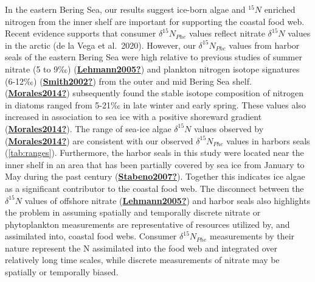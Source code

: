 \documentclass [11pt, proquest] {uwthesis}[2015/03/03]
\begin{document}
In the eastern Bering Sea, our results suggest ice-born algae and \(^{15}N\) enriched nitrogen from the inner shelf are important for supporting the coastal food web. Recent evidence supports that consumer \(\delta^{15}N_{Phe}\) values reflect nitrate \(\delta^{15}N\) values in the arctic (de la Vega et al.~2020). However, our \(\delta^{15}N_{Phe}\) values from harbor seals of the eastern Bering Sea were high relative to previous studies of summer nitrate (5 to 9‰) (\protect\hyperlink{ref-Lehmann2005}{\textbf{Lehmann2005?}}) and plankton nitrogen isotope signatures (6-12‰) (\protect\hyperlink{ref-Smith2002}{\textbf{Smith2002?}}) from the outer and mid Bering Sea shelf. (\protect\hyperlink{ref-Morales2014}{\textbf{Morales2014?}}) subsequently found the stable isotope composition of nitrogen in diatoms ranged from 5-21‰ in late winter and early spring. These values also increased in association to sea ice with a positive shoreward gradient (\protect\hyperlink{ref-Morales2014}{\textbf{Morales2014?}}). The range of sea-ice algae \(\delta^{15}N\) values observed by (\protect\hyperlink{ref-Morales2014}{\textbf{Morales2014?}}) are consistent with our observed \(\delta^{15}N_{Phe}\) values in harbors seals (\ref{tab:ranges}). Furthermore, the harbor seals in this study were located near the inner shelf in an area that has been partially covered by sea ice from January to May during the past century (\protect\hyperlink{ref-Stabeno2007}{\textbf{Stabeno2007?}}). Together this indicates ice algae as a significant contributor to the coastal food web. The disconnect between the \(\delta^{15}N\) values of offshore nitrate (\protect\hyperlink{ref-Lehmann2005}{\textbf{Lehmann2005?}}) and harbor seals also highlights the problem in assuming spatially and temporally discrete nitrate or phytoplankton measurements are representative of resources utilized by, and assimilated into, coastal food webs. Consumer \(\delta^{15}N_{Phe}\) measurements by their nature represent the N assimilated into the food web and integrated over relatively long time scales, while discrete measurements of nitrate may be spatially or temporally biased.
\end{document}
